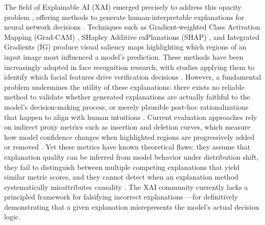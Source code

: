 The field of Explainable AI (XAI) emerged precisely to address this opacity problem \cite{gunning2017xai,doshivelez2017rigorous}, offering methods to generate human-interpretable explanations for neural network decisions \cite{adadi2018peeking}. Techniques such as Gradient-weighted Class Activation Mapping (Grad-CAM) \cite{selvaraju2019gradcam}, SHapley Additive exPlanations (SHAP) \cite{lundberg2017unified}, and Integrated Gradients (IG) \cite{Sundararajan2017_IG} produce visual saliency maps highlighting which regions of an input image most influenced a model's prediction. These methods have been increasingly adopted in face recognition research, with studies applying them to identify which facial features drive verification decisions \cite{Lin2021_xCos,dhar2021understanding,wang2021survey}. However, a fundamental problem undermines the utility of these explanations: there exists no reliable method to validate \cite{alvarezmelis2018robustness} whether generated explanations are actually faithful to the model's decision-making process, or merely plausible post-hoc rationalizations that happen to align with human intuitions \cite{rudin2019stop,leavy2020interpretation}. Current evaluation approaches rely on indirect proxy metrics such as insertion and deletion curves, which measure how model confidence changes when highlighted regions are progressively added or removed \cite{petsiuk2018rise,samek2016evaluating}. Yet these metrics have known theoretical flaws: they assume that explanation quality can be inferred from model behavior under distribution shift, they fail to distinguish between multiple competing explanations that yield similar metric scores, and they cannot detect when an explanation method systematically misattributes causality \cite{hooker2019benchmark,Adebayo2018_SanityChecks,tomsett2020sanity}. The XAI community currently lacks a principled framework for falsifying incorrect explanations \cite{Samek2021_XAI_Review,Linardatos2021_XAI_Interpretability,nauta2023quantitative}---for definitively demonstrating that a given explanation misrepresents the model's actual decision logic.

